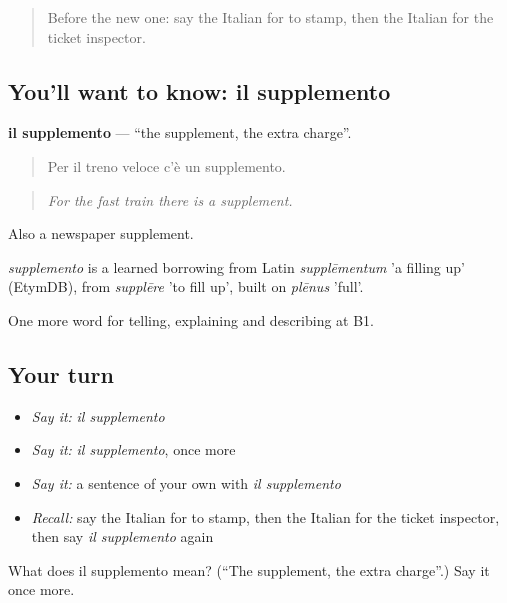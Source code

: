 \label{lesson:IT-C418-supplemento}



\begin{quote}
Before the new one: say the Italian for to stamp, then the Italian for the ticket inspector.
\end{quote}

\subsection*{You'll want to know: il supplemento}
\textbf{il supplemento} — \textquotedblleft{}the supplement, the extra charge\textquotedblright{}.

\begin{quote}
Per il treno veloce c'è un supplemento.
\end{quote}

\begin{quote}
\emph{For the fast train there is a supplement.}
\end{quote}

Also a newspaper supplement.

\begin{cousinweb}
\emph{supplemento} is a learned borrowing from Latin \emph{supplēmentum} 'a filling up' (EtymDB), from \emph{supplēre} 'to fill up', built on \emph{plēnus} 'full'.
\end{cousinweb}

\begin{grammarlens}[title={What you've built}]
One more word for telling, explaining and describing at B1.
\end{grammarlens}

\subsection*{Your turn}
\begin{itemize}
\raggedright
  \item \emph{Say it:} \emph{il supplemento}
  \item \emph{Say it:} \emph{il supplemento}, once more
  \item \emph{Say it:} a sentence of your own with \emph{il supplemento}
  \item \emph{Recall:} say the Italian for to stamp, then the Italian for the ticket inspector, then say \emph{il supplemento} again
\end{itemize}

\begin{tcolorbox}[breakable,colback=teal!4,colframe=teal!35!black,title={Before you move on}]
What does il supplemento mean? (\textquotedblleft{}The supplement, the extra charge\textquotedblright{}.) Say it once more.
\end{tcolorbox}
